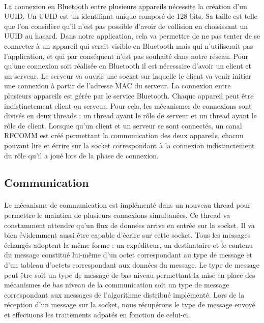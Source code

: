 \documentclass[a4paper,10pt]{report}
\begin{document}
    \paragraph{}
    La connexion en Bluetooth entre plusieurs appareils nécessite la création d'un UUID. Un UUID est un identifiant unique composé de 128 bits. Sa taille est telle que l'on considère qu'il n'est pas possible d'avoir de collision en choisissant un UUID au hasard. Dans notre application, cela va permettre de ne pas tenter de se connecter à un appareil qui serait visible en Bluetooth mais qui n'utiliserait pas l'application, et qui par conséquent n'est pas souhaité dans notre réseau.
    Pour qu'une connexion soit réalisée en Bluetooth il est nécessaire d'avoir un client et un serveur. Le serveur va ouvrir une socket sur laquelle le client va venir initier une connexion à partir de l'adresse MAC du serveur.
    La connexion entre plusieurs appareils est gérée par le service Bluetooth. Chaque appareil peut être indistinctement client ou serveur. Pour cela, les mécanismes de connexions sont divisés en deux threads : un thread ayant le rôle de serveur et un thread ayant le rôle de client.
    Lorsque qu'un client et un serveur se sont connectés, un canal RFCOMM est créé permettant la communication des deux appareils, chacun pouvant lire et écrire sur la socket correspondant à la connexion indistinctement du rôle qu'il a joué lors de la phase de connexion.
    
    \subsection{Communication}
    \paragraph{}
    Le mécanisme de communication est implémenté dans un nouveau thread pour permettre le maintien de plusieurs connexions simultanées. Ce thread va constamment attendre qu'un flux de données arrive en entrée sur la socket. Il va bien évidemment aussi être capable d'écrire sur cette socket.
    Tous les messages échangés adoptent la même forme : un expéditeur, un destinataire et le contenu du message constitué lui-même d'un octet correspondant au type de message et d'un tableau d'octets correspondant aux données du message. Le type de message peut être soit un type de message de bas niveau permettant la mise en place des mécanismes de bas niveau de la communication soit un type de message correspondant aux messages de l'algorithme distribué implémenté.
    Lors de la réception d'un message sur la socket, nous récupérons le type de message envoyé et effectuons les traitements adpatés en fonction de celui-ci.
    
\end{document}
